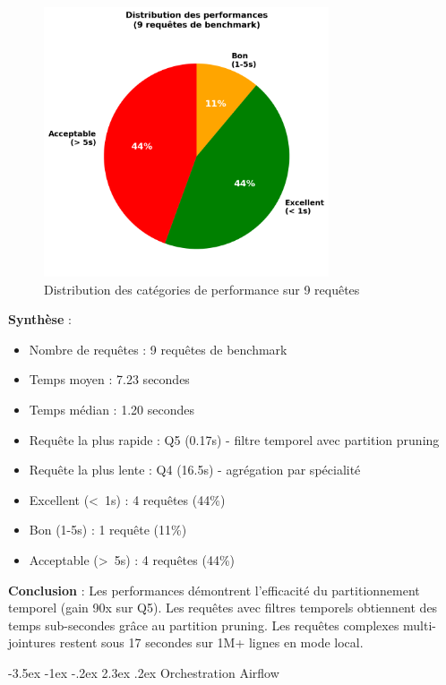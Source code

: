 \documentclass[12pt,a4paper]{article}
\makeatletter
\renewcommand\section{\@startsection{section}{1}{\z@}%
    {-3.5ex \@plus -1ex \@minus -.2ex}%
    {2.3ex \@plus.2ex}%
    {\normalfont\Large\bfseries\color{blue!70!black}}}
\makeatother
\begin{document}
\begin{figure}[H]
\centering
\includegraphics[width=0.75\textwidth]{performance_distribution.png}
\caption{Distribution des catégories de performance sur 9 requêtes}
\label{fig:perf_distribution}
\end{figure}

\textbf{Synthèse} :
\begin{itemize}
\item Nombre de requêtes : 9 requêtes de benchmark
\item Temps moyen : 7.23 secondes
\item Temps médian : 1.20 secondes
\item Requête la plus rapide : Q5 (0.17s) - filtre temporel avec partition pruning
\item Requête la plus lente : Q4 (16.5s) - agrégation par spécialité
\item Excellent (\textless\ 1s) : 4 requêtes (44\%)
\item Bon (1-5s) : 1 requête (11\%)
\item Acceptable (\textgreater\ 5s) : 4 requêtes (44\%)
\end{itemize}

\textbf{Conclusion} : Les performances démontrent l'efficacité du partitionnement temporel (gain 90x sur Q5). Les requêtes avec filtres temporels obtiennent des temps sub-secondes grâce au partition pruning. Les requêtes complexes multi-jointures restent sous 17 secondes sur 1M+ lignes en mode local.

\newpage
\section{Orchestration Airflow}
\end{document}
